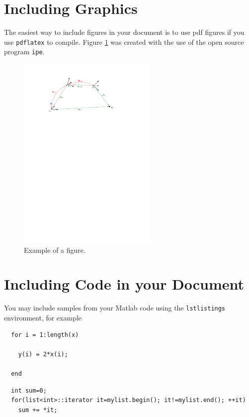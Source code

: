 \section{Including Graphics}\label{sec:epsgraph}
  The easiest way to include figures in your document is to use pdf figures if you use \texttt{pdflatex} to compile. Figure \ref{img:notation} was created with the use of the open source program \texttt{ipe}.

  \begin{figure}[h]
     \centering
     \includegraphics[width=0.6\textwidth]{img/notation.pdf}
     \caption{Example of a figure.}
     \label{img:notation}
  \end{figure}


\section{Including Code in your Document}

  You may include samples from your Matlab code using the \texttt{lstlistings} environment, for example
  \lstset{language=Matlab,numbers=none}
  \begin{lstlisting}[frame=lines, caption=Matlab Example, label=matlabexample]
  % Evaluate y = 2x
  for i = 1:length(x)

    y(i) = 2*x(i);

  end
  \end{lstlisting}

  \lstset{language=C++,numbers=none,caption=C++ Example, label=cppexample}
  \begin{lstlisting}[frame=lines]
  % sum all elements in a list
  int sum=0;
  for(list<int>::iterator it=mylist.begin(); it!=mylist.end(); ++it)
    sum += *it;
  \end{lstlisting}
